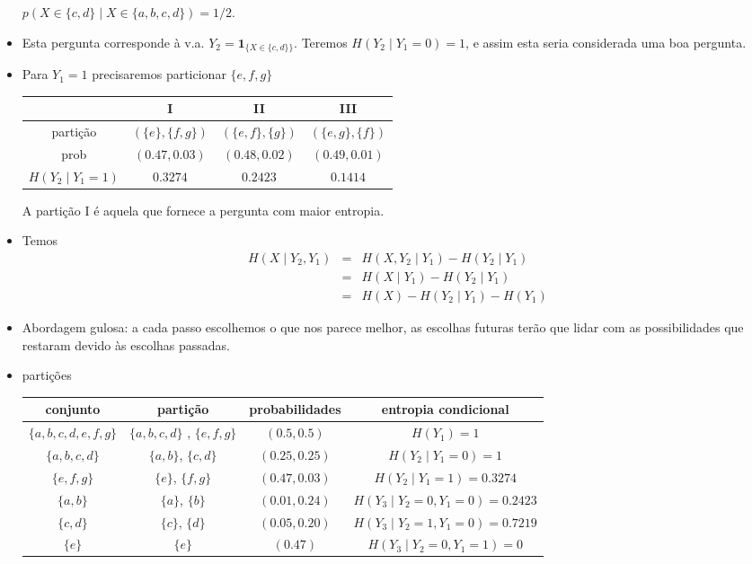 \begin{frame}[allowframebreaks]
\begin{itemize}
	$p(X \in \{c,d\} \mid X \in \{a,b,c,d\}) = 1/2$.
  \item Esta pergunta corresponde à v.a. $Y_2 = \mathbf{1}_{\{X \in \{c,d\}\}}$. Teremos $H(Y_2 \mid Y_1 = 0) = 1$, e assim
	esta seria considerada uma boa pergunta.
  \item Para $Y_1 = 1$ precisaremos particionar $\{e,f,g\}$
	\begin{tabular}{c|c|c|c}
		 & I & II & III \\ \hline
	partição & $(\{e\},\{f,g\})$ & $(\{e,f\},\{g\})$ & $(\{e,g\},\{f\})$ \\ \hline
	prob	 & $(0.47, 0.03)$ & $(0.48, 0.02)$ & $(0.49, 0.01)$ \\ \hline
	$H(Y_2 \mid Y_1 = 1)$ & $0.3274$ & $0.2423$ & $0.1414$
	\end{tabular}
	A partição I é aquela que fornece a pergunta com maior entropia.
  \item Temos
	\begin{eqnarray}
	H(X \mid Y_2, Y_1) &=& H(X,Y_2 \mid Y_1) - H(Y_2 \mid Y_1) \\
			&=& H(X \mid Y_1) - H(Y_2 \mid Y_1) \\
			&=& H(X) - H(Y_2 \mid Y_1) - H(Y_1)
	\end{eqnarray}
  \item Abordagem gulosa: a cada passo escolhemos o que nos parece melhor, as escolhas futuras terão que lidar
	com as possibilidades que restaram devido às escolhas passadas.
  \item partições
	\begin{scriptsize}
	\hspace*{-1cm}
	\begin{tabular}{c|c|c|c}
	conjunto	  & partição & probabilidades & entropia condicional \\ \hline
	$\{a,b,c,d,e,f,g\}$ 	& $\{a,b,c,d\}$ , $\{e,f,g\}$ 	& $(0.5, 0.5)$ 		& $H(Y_1) = 1$ \\ \hline
	$\{a,b,c,d\}$ 		& $\{a,b\}$, $\{c,d\}$		& $(0.25, 0.25)$ 	& $H(Y_2 \mid Y_1 = 0) = 1$ \\ \hline
	$\{e,f,g\}$		& $\{e\}$, $\{f,g\}$ 		& $(0.47, 0.03)$ 	& $H(Y_2 \mid Y_1 = 1) = 0.3274$ \\ \hline
	$\{a,b\}$		& $\{a\}$, $\{b\}$		& $(0.01, 0.24)$	& $H(Y_3 \mid Y_2 = 0, Y_1 = 0) = 0.2423$ \\ \hline
	$\{c,d\}$		& $\{c\}$, $\{d\}$		& $(0.05, 0.20)$	& $H(Y_3 \mid Y_2 = 1, Y_1 = 0) = 0.7219$ \\ \hline
	$\{e\}$			& $\{e\}$ 			& $(0.47)$		& $H(Y_3 \mid Y_2 = 0, Y_1 = 1) = 0$ \\ \hline

\end{tabular}
\end{scriptsize}
\end{itemize}
\end{frame}
